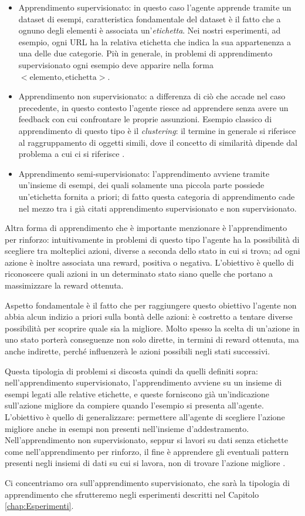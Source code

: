 \documentclass[../../main.tex]{subfiles}
\begin{document}
    \begin{itemize}
        \item Apprendimento supervisionato: in questo caso l'agente apprende tramite un dataset di esempi, caratteristica fondamentale del dataset è il fatto che a ognuno degli elementi è associata un'\textit{etichetta}. Nei nostri esperimenti, ad esempio, ogni URL ha la relativa etichetta che indica la sua appartenenza a una delle due categorie. Più in generale, in problemi di apprendimento supervisionato ogni esempio deve apparire nella forma $ <\text{elemento}, \text{etichetta}> $.
        \item Apprendimento non supervisionato: a differenza di ciò che accade nel caso precedente, in questo contesto l'agente riesce ad apprendere senza avere un feedback con cui confrontare le proprie assunzioni. Esempio classico di apprendimento di questo tipo è il \textit{clustering}: il termine in generale si riferisce al raggruppamento di oggetti simili, dove il concetto di similarità dipende dal problema a cui ci si riferisce \cite{goodfellow2016deep}.
        \item Apprendimento semi-supervisionato: l'apprendimento avviene tramite un'insieme di esempi, dei quali solamente una piccola parte possiede un'etichetta fornita a priori; di fatto questa categoria di apprendimento cade nel mezzo tra i già citati apprendimento supervisionato e non supervisionato.
    \end{itemize}

    Altra forma di apprendimento che è importante menzionare è l'apprendimento per rinforzo: intuitivamente in problemi di questo tipo l'agente ha la possibilità di scegliere tra molteplici azioni, diverse a seconda dello stato in cui si trova; ad ogni azione è inoltre associata una reward, positiva o negativa. L'obiettivo è quello di riconoscere quali azioni in un determinato stato siano quelle che portano a massimizzare la reward ottenuta.

    Aspetto fondamentale è il fatto che per raggiungere questo obiettivo l'agente non abbia alcun indizio a priori sulla bontà delle azioni: è costretto a tentare diverse possibilità per scoprire quale sia la migliore. Molto spesso la scelta di un'azione in uno stato porterà conseguenze non solo dirette, in termini di reward ottenuta, ma anche indirette, perché influenzerà le azioni possibili negli stati successivi.

    Questa tipologia di problemi si discosta quindi da quelli definiti sopra: nell'apprendimento supervisionato, l'apprendimento avviene su un insieme di esempi legati alle relative etichette, e queste forniscono già un'indicazione sull'azione migliore da compiere quando l'esempio si presenta all'agente. L'obiettivo è quello di generalizzare: permettere all'agente di scegliere l'azione migliore anche in esempi non presenti nell'insieme d'addestramento.\\
    Nell'apprendimento non supervisionato, seppur si lavori su dati senza etichette come nell'apprendimento per rinforzo, il fine è apprendere gli eventuali pattern presenti negli insiemi di dati su cui si lavora, non di trovare l'azione migliore \cite{Sutton1998}. 

    Ci concentriamo ora sull'apprendimento supervisionato, che sarà la tipologia di apprendimento che sfrutteremo negli esperimenti descritti nel Capitolo \ref{chap:Esperimenti}.
\end{document}
